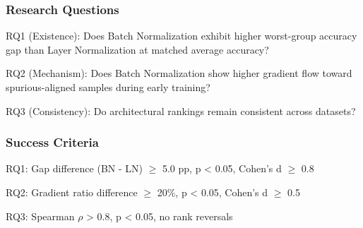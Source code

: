 
\subsubsection{Research Questions}

RQ1 (Existence): Does Batch Normalization exhibit higher worst-group accuracy gap than Layer Normalization at matched average accuracy?

RQ2 (Mechanism): Does Batch Normalization show higher gradient flow toward spurious-aligned samples during early training?

RQ3 (Consistency): Do architectural rankings remain consistent across datasets?

\subsubsection{Success Criteria}

RQ1: Gap difference (BN - LN) $\geq$ 5.0 pp, p < 0.05, Cohen's d $\geq$ 0.8

RQ2: Gradient ratio difference $\geq$ 20\%, p < 0.05, Cohen's d $\geq$ 0.5

RQ3: Spearman $\rho$ > 0.8, p < 0.05, no rank reversals
